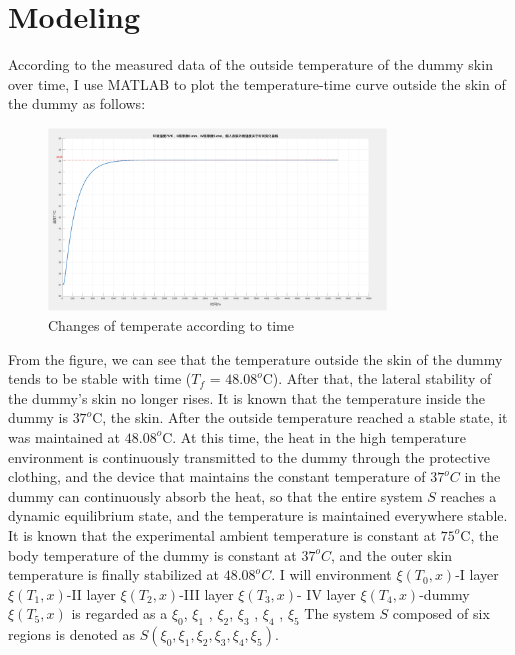\documentclass[12pt]{ctexart}
\begin{document}
\section{Modeling}
According to the measured data of the outside temperature of the dummy skin over time, I use MATLAB to plot the temperature-time curve outside the skin of the dummy as follows:\\
\begin{figure}[H]
\centering
\includegraphics[width=0.8\textwidth]{1.png}
\caption{Changes of temperate according to time}
\end{figure}
From the figure, we can see that the temperature outside the skin of the dummy tends to be stable with time ($T_f$ = $48.08^{o}$C). After that, the lateral stability of the dummy's skin no longer rises. It is known that the temperature inside the dummy is $37^{o}$C, the skin. After the outside temperature reached a stable state, it was maintained at $48.08^{o}$C. At this time, the heat in the high temperature environment is continuously transmitted to the dummy through the protective clothing, and the device that maintains the constant temperature of $37^{o}C$ in the dummy can continuously absorb the heat, so that the entire system $S$ reaches a dynamic equilibrium state, and the temperature is maintained everywhere stable.\\
\indent It is known that the experimental ambient temperature is constant at $75^{o}$C, the body temperature of the dummy is constant at $37^{o}C$, and the outer skin temperature is finally stabilized at $48.08^{o}C$. I will environment $\xi(T_0 , x)$-I layer $\xi(T_1 , x)$-II layer $\xi(T_2 , x)$-III layer $\xi(T_3 , x)$- IV layer $\xi(T_4 , x)$-dummy $\xi(T_5 , x)$ is regarded as a $\xi_{0} $, $\xi _1$ , $\xi_2$, $\xi_3$ , $\xi_4$ , $\xi_5$ The system $S$ composed of six regions is denoted as $S(\xi_0 , \xi_1 , \xi_2 , \xi_3 , \xi_4 , \xi_5 )$.\\
\end{document}
